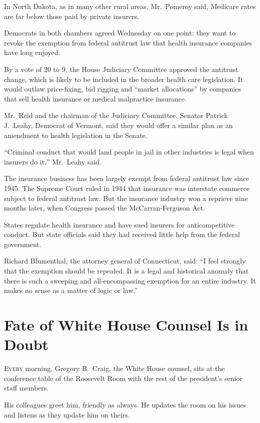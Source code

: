 ﻿\documentclass[12pt]{article}
\begin{document}
In North Dakota, as in many other rural areas, Mr.~Pomeroy said, Medicare rates are far below those
paid by private insurers.

Democrats in both chambers agreed Wednesday on one point: they want to revoke\cite{revoke} the
exemption\cite{exemption} from federal antitrust law that health insurance companies have long
enjoyed.

By a vote of 20 to 9, the House Judiciary Committee approved the antitrust change, which is likely
to be included in the broader health care legislation. It would outlaw price-fixing, bid rigging and
``market allocations'' by companies that sell health insurance or medical malpractice insurance.

Mr.~Reid and the chairman of the Judiciary Committee, Senator Patrick J.~Leahy, Democrat of Vermont,
said they would offer a similar plan as an amendment\cite{amendment} to health legislation in the
Senate.

``Criminal conduct that would land people in jail in other industries is legal when insurers do
it,'' Mr.~Leahy said.

The insurance business has been largely exempt from federal antitrust law since 1945. The Supreme
Court ruled in 1944 that insurance was interstate commerce subject to federal antitrust law. But the
insurance industry won a reprieve nine months later, when Congress passed the McCarran-Ferguson Act.

States regulate health insurance and have sued insurers for anticompetitive conduct. But state
officials said they had received little help from the federal government.

Richard Blumenthal, the attorney general of Connecticut, said: ``I feel strongly that the exemption
should be repealed. It is a legal and historical anomaly\cite{anomaly} that there is such a sweeping
and all-encompassing exemption for an entire industry. It makes no sense as a matter of logic or
law.''

\section{Fate of White House Counsel Is in Doubt}

\lettrine{E}{very} morning, Gregory B.~Craig, the White House counsel, sits
at the conference table of the Roosevelt Room with the rest of the president's senior staff members.

His colleagues greet him, friendly as always. He updates the room on his issues and listens as they
update him on theirs.
\end{document}

